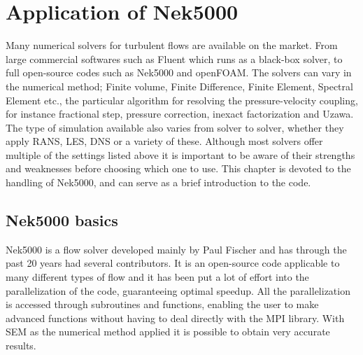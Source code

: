 
\chapter{Application of Nek5000} %

\label{nek} %




Many numerical solvers for turbulent flows are available on the market.
From large commercial softwares such as Fluent which runs as a 
black-box solver, to full open-source codes such as Nek5000 and openFOAM. 
The solvers can vary in the numerical method; Finite volume, Finite Difference, 
Finite Element, Spectral Element etc., the particular algorithm 
for resolving the pressure-velocity coupling, for instance fractional step, pressure correction, 
inexact factorization and Uzawa.
The type of simulation available also varies from solver to solver, whether
they apply RANS, LES, DNS or a variety of these. Although most solvers offer multiple of the settings
listed above it is important to be aware of their strengths and weaknesses before choosing which 
one to use. This chapter is devoted to the handling of Nek5000, and can serve
as a brief introduction to the code.

\section{Nek5000 basics}

Nek5000 is a flow solver developed mainly by Paul Fischer
and has through the past 20 years had several contributors. 
It is an open-source code applicable to many different types of flow 
and it has been put a lot of effort into the parallelization of the code, 
guaranteeing optimal speedup. All the parallelization is accessed through subroutines
and functions, enabling the user to make advanced functions without having to 
deal directly with the MPI library.
With SEM as the numerical method applied it is possible to obtain very accurate results.  

